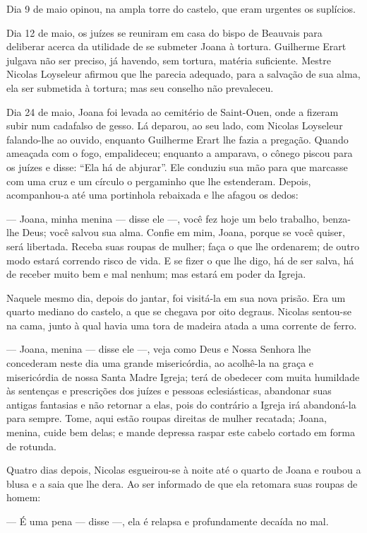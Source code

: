 Dia 9 de maio opinou, na ampla torre do castelo, que eram urgentes os
suplícios.

Dia 12 de maio, os juízes se reuniram em casa do bispo de Beauvais para
deliberar acerca da utilidade de se submeter Joana à tortura. Guilherme
Erart julgava não ser preciso, já havendo, sem tortura, matéria
suficiente. Mestre Nicolas Loyseleur afirmou que lhe parecia adequado,
para a salvação de sua alma, ela ser submetida à tortura; mas seu conselho
não prevaleceu.

Dia 24 de maio, Joana foi levada ao cemitério de Saint-Ouen, onde a fizeram
subir num cadafalso de gesso. Lá deparou, ao seu lado, com Nicolas
Loyseleur falando-lhe ao ouvido, enquanto Guilherme Erart lhe fazia a
pregação. Quando ameaçada com o fogo, empalideceu; enquanto a amparava, o
cônego piscou para os juízes e disse: “Ela há de abjurar”. Ele conduziu
sua mão para que marcasse com uma cruz e um círculo o pergaminho que lhe
estenderam. Depois, acompanhou-a até uma portinhola rebaixada e lhe afagou
os dedos:

--- Joana, minha menina --- disse ele ---, você fez hoje um belo trabalho, benza-lhe
Deus; você salvou sua alma. Confie em mim, Joana, porque se você quiser,
será libertada. Receba suas roupas de mulher; faça o que lhe ordenarem; de
outro modo estará correndo risco de vida. E se fizer o que lhe digo, há de
ser salva, há de receber muito bem e mal nenhum; mas estará em poder da
Igreja.

Naquele mesmo dia, depois do jantar, foi visitá-la em sua nova prisão. Era
um quarto mediano do castelo, a que se chegava por oito degraus. Nicolas
sentou-se na cama, junto à qual havia uma tora de madeira atada a uma
corrente de ferro.

--- Joana, menina --- disse ele ---, veja como Deus e Nossa Senhora lhe concederam
neste dia uma grande misericórdia, ao acolhê-la na graça e misericórdia de
nossa Santa Madre Igreja; terá de obedecer com muita humildade às
sentenças e prescrições dos juízes e pessoas eclesiásticas, abandonar suas
antigas fantasias e não retornar a elas, pois do contrário a Igreja irá
abandoná-la para sempre. Tome, aqui estão roupas direitas de mulher
recatada; Joana, menina, cuide bem delas; e mande depressa raspar este
cabelo cortado em forma de rotunda.

Quatro dias depois, Nicolas esgueirou-se à noite até o quarto de Joana e
roubou a blusa e a saia que lhe dera. Ao ser informado de que ela retomara
suas roupas de homem:

--- É uma pena --- disse ---, ela é relapsa e profundamente decaída no mal.

